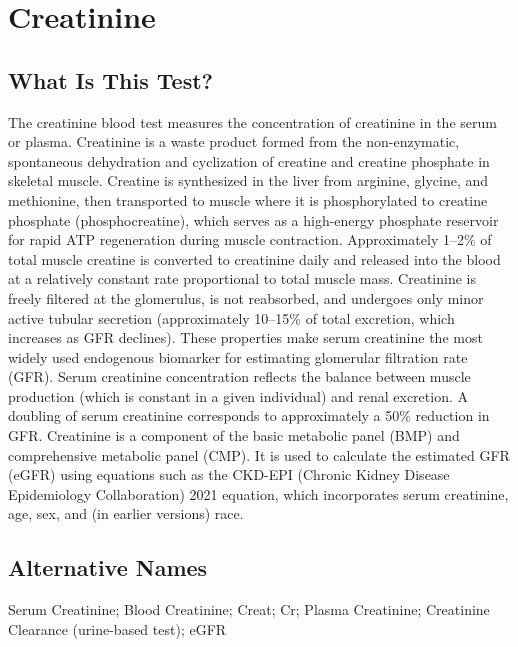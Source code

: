 \chapter{Creatinine}

\section*{What Is This Test?}
The creatinine blood test measures the concentration of creatinine in the serum or plasma. Creatinine is a waste product formed from the non-enzymatic, spontaneous dehydration and cyclization of creatine and creatine phosphate in skeletal muscle. Creatine is synthesized in the liver from arginine, glycine, and methionine, then transported to muscle where it is phosphorylated to creatine phosphate (phosphocreatine), which serves as a high-energy phosphate reservoir for rapid ATP regeneration during muscle contraction. Approximately 1--2\% of total muscle creatine is converted to creatinine daily and released into the blood at a relatively constant rate proportional to total muscle mass. Creatinine is freely filtered at the glomerulus, is not reabsorbed, and undergoes only minor active tubular secretion (approximately 10--15\% of total excretion, which increases as GFR declines). These properties make serum creatinine the most widely used endogenous biomarker for estimating glomerular filtration rate (GFR). Serum creatinine concentration reflects the balance between muscle production (which is constant in a given individual) and renal excretion. A doubling of serum creatinine corresponds to approximately a 50\% reduction in GFR. Creatinine is a component of the basic metabolic panel (BMP) and comprehensive metabolic panel (CMP). It is used to calculate the estimated GFR (eGFR) using equations such as the CKD-EPI (Chronic Kidney Disease Epidemiology Collaboration) 2021 equation, which incorporates serum creatinine, age, sex, and (in earlier versions) race.

\section*{Alternative Names}
Serum Creatinine; Blood Creatinine; Creat; Cr; Plasma Creatinine; Creatinine Clearance (urine-based test); eGFR


